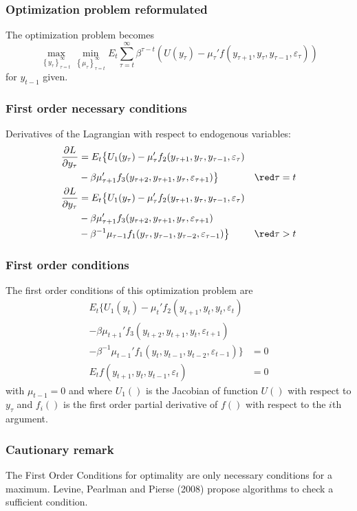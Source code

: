 \documentclass{beamer}
\begin{document}
\begin{frame}\frametitle{Optimization problem reformulated}
The optimization problem becomes
\[
\max_{\left\{y_\tau\right\}_{\tau=t}^\infty}\min_{\left\{\mu_\tau\right\}_{\tau=t}^\infty} E_t\sum_{\tau=t}^\infty\beta^{\tau-t}\left(U(y_\tau)-\mu_\tau'f\left(y_{\tau+1}, y_{\tau}, y_{\tau-1}, \varepsilon_{\tau}\right)\right)
\]
for $y_{t-1}$ given.
\end{frame}

\begin{frame}
\frametitle{First order necessary conditions}
Derivatives of the Lagrangian with respect to endogenous variables:
\begin{align*}
  \frac{\partial L}{\partial y_\tau} &=   E_{t}\big\{U_{1}(y_\tau)-\mu_\tau'f_{2}(y_{\tau+1}, y_{\tau}, y_{\tau-1},
\varepsilon_{\tau})\\
& -\beta\mu_{\tau+1}'f_{3}( y_{\tau+2},
y_{\tau+1}, y_{\tau}, \varepsilon_{\tau+1})\big\}\;\;\;\;\;&{\red \tau = t} \\ 
  \frac{\partial L}{\partial y_\tau} &=   E_{t}\big\{U_{1}(y_{\tau})-\mu_{\tau}'f_{2}(y_{\tau+1}, y_{\tau}, y_{\tau-1},
\varepsilon_{\tau})\\
& -\beta\mu_{\tau+1}'f_{3}( y_{\tau+2},
y_{\tau+1}, y_{\tau}, \varepsilon_{\tau+1}) \\ 
&-\beta^{-1}\mu_{\tau-1}f_{1}(y_{\tau}, y_{\tau-1}, y_{\tau-2},
\varepsilon_{\tau-1})\big\}&{\red \tau > t}
\end{align*}
\end{frame}

\begin{frame}
\frametitle{First order conditions}
The first order conditions of this optimization problem are
\begin{align*}
   E_{t}\big\{U_{1}(y_t)-\mu_{t}'f_{2}(y_{t+1}, y_t, y_t,
\varepsilon_t)&\\
 -\beta\mu_{t+1}'f_{3}( y_{t+2},
y_{t+1}, y_t, \varepsilon_{t+1}) &\\ 
-\beta^{-1}\mu_{t-1}'f_{1}(y_t, y_{t-1}, y_{t-2},
\varepsilon_{t-1})\big\} &= 0\\
E_{t}f\left(y_{t+1},y_t,y_{t-1},\varepsilon_t\right)
  &= 0
\end{align*}
with $\mu_{t-1}=0$ and where $U_1()$ is the Jacobian of function $U()$ with respect to $y_\tau$ and $f_i()$ is the first order partial derivative of $f()$ with respect to the $i$th argument.
\end{frame}

\begin{frame}
  \frametitle{Cautionary remark}
The First Order Conditions for optimality are only necessary conditions for a maximum. Levine, Pearlman and Pierse (2008) propose algorithms to check a sufficient condition. 
\end{frame}
\end{document}

